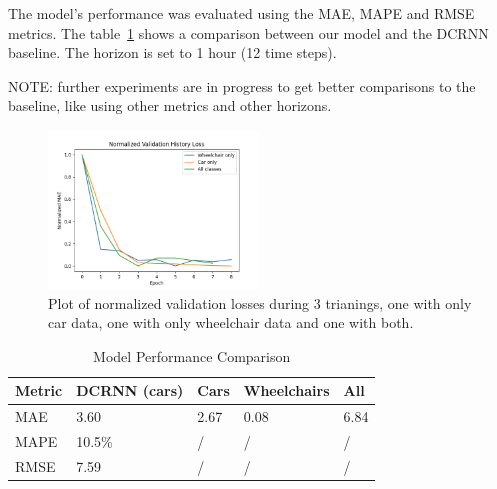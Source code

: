 The model's performance was evaluated using the MAE, MAPE and RMSE metrics.
The table~\ref{tab:model_performance_comparison} shows a comparison between our model and the DCRNN baseline.
The horizon is set to 1 hour (12 time steps).

NOTE: further experiments are in progress to get better comparisons to the baseline, like using other metrics and other horizons.

\begin{figure}[htbp]
    \centering
    \includegraphics[width=0.5\textwidth]{resources/normalized_val_losses}
    \caption{
        Plot of normalized validation losses during 3 trianings, one with only car data, one with only wheelchair data and one with both.
    }
    \label{fig:normalized_val_losses}
\end{figure}

\begin{table}[htbp]
    \caption{Model Performance Comparison}
    \center
    \begin{tabular}{@{}lllll@{}}
        \toprule
        \textbf{Metric} & \textbf{DCRNN (cars)} & \textbf{Cars} & \textbf{Wheelchairs} & \textbf{All} \\
        \midrule
        MAE             & 3.60                  & 2.67          & 0.08                 & 6.84         \\
        MAPE            & 10.5\%                & /             & /                    & /            \\
        RMSE            & 7.59                  & /             & /                    & /            \\
        \bottomrule
    \end{tabular}
    \label{tab:model_performance_comparison}
\end{table}